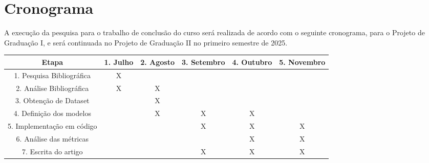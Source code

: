 \chapter{Cronograma}

A execução da pesquisa para o trabalho de conclusão do curso será realizada de acordo com o seguinte cronograma, para o Projeto de Graduação I, e será continuada no Projeto de Graduação II no primeiro semestre de 2025.

\begin{table}[h]
	\begin{tcolorbox}[width=\textwidth]
	\centering
	\renewcommand{\arraystretch}{1.5}
	\begin{adjustbox}{width=\textwidth}
	\begin{tabular}{|c|c|c|c|c|c|}
		\hline
		\textbf{Etapa} & 
		\textbf{1. Julho} & 
		\textbf{2. Agosto} & 
		\textbf{3. Setembro} & 
		\textbf{4. Outubro} & 
		\textbf{5. Novembro} \\ \hline
		1. Pesquisa Bibliográfica & X & &  &  &  \\ \hline
		2. Análise Bibliográfica & X & X &  &  &  \\ \hline
		3. Obtenção de Dataset &  & X &  &  &  \\ \hline
		4. Definição dos modelos &  & X & X & X &  \\ \hline
		5. Implementação em código &  &  & X & X & X \\ \hline
		6. Análise das métricas &  &  & & X & X \\ \hline
		7. Escrita do artigo &  & & X & X & X \\ \hline
	\end{tabular}
\end{adjustbox}
\end{tcolorbox}
\end{table}